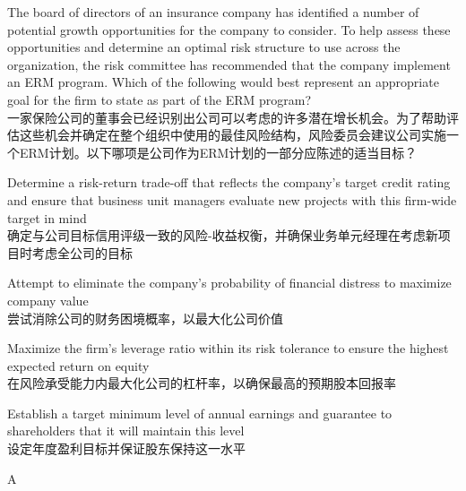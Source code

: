 \documentclass{article}
\newcounter{question} %
\begin{document}
\begin{question}
    The board of directors of an insurance company has identified a number of potential growth opportunities for the company to consider. To help assess these opportunities and determine an optimal risk structure to use across the organization, the risk committee has recommended that the company implement an ERM program. Which of the following would best represent an appropriate goal for the firm to state as part of the ERM program?
    \\一家保险公司的董事会已经识别出公司可以考虑的许多潜在增长机会。为了帮助评估这些机会并确定在整个组织中使用的最佳风险结构，风险委员会建议公司实施一个ERM计划。以下哪项是公司作为ERM计划的一部分应陈述的适当目标？
\end{question}

\begin{choices}
    \item Determine a risk-return trade-off that reflects the company's target credit rating and ensure that business unit managers evaluate new projects with this firm-wide target in mind
    \\确定与公司目标信用评级一致的风险-收益权衡，并确保业务单元经理在考虑新项目时考虑全公司的目标
    \item Attempt to eliminate the company's probability of financial distress to maximize company value
    \\尝试消除公司的财务困境概率，以最大化公司价值
    \item Maximize the firm's leverage ratio within its risk tolerance to ensure the highest expected return on equity
    \\在风险承受能力内最大化公司的杠杆率，以确保最高的预期股本回报率
    \item Establish a target minimum level of annual earnings and guarantee to shareholders that it will maintain this level
    \\设定年度盈利目标并保证股东保持这一水平
\end{choices}

\begin{correctanswer}
    A
\end{correctanswer}
\end{document}
